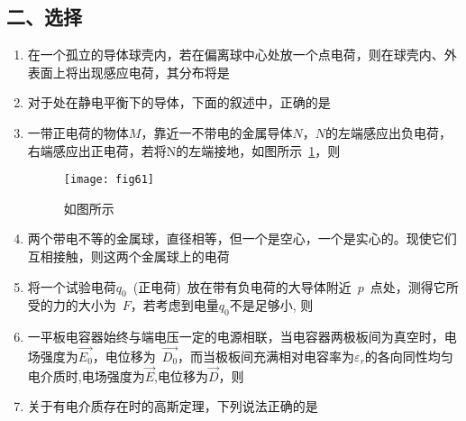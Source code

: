 \subsection*{二、选择}
\begin{enumerate}
    \item  在一个孤立的导体球壳内，若在偏离球中心处放一个点电荷，则在球壳内、外表面上将出现感应电荷，其分布将是~\spaces
    \item 对于处在静电平衡下的导体，下面的叙述中，正确的是~\spaces
    \item 一带正电荷的物体$M$，靠近一不带电的金属导体$N$，$N$的左端感应出负电荷，右端感应出正电荷，若将N的左端接地，如图所示~\ref{fig:61}，则~\spaces
    \begin{figure}[H]
        \centering
        \texttt{[image: fig61]}
        \caption{如图所示}\label{fig:61}
    \end{figure}
    \item 两个带电不等的金属球，直径相等，但一个是空心，一个是实心的。现使它们互相接触，则这两个金属球上的电荷~\spaces
    \item 将一个试验电荷$q_0$~(正电荷)~放在带有负电荷的大导体附近~$p$~点处，测得它所受的力的大小为~$F$，若考虑到电量$q_0$不是足够小, 则~\spaces
    \item 一平板电容器始终与端电压一定的电源相联，当电容器两极板间为真空时，电场强度为$\vec{E_0}$，电位移为~$\vec{D_0}$，而当极板间充满相对电容率为$\varepsilon_r$的各向同性均匀电介质时,电场强度为$\vec{E}$,电位移为$\vec{D}$，则~\spaces
    \item 关于有电介质存在时的高斯定理，下列说法正确的是~\spaces

\end{enumerate}
